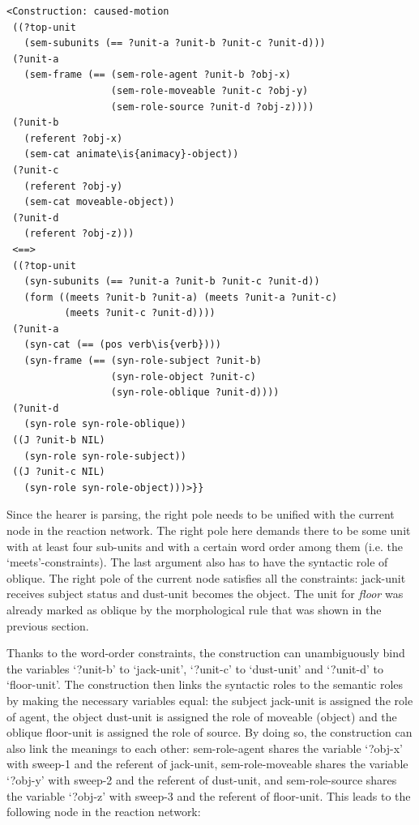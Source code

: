 \ea
\begin{lstlisting}
<Construction: caused-motion
 ((?top-unit
   (sem-subunits (== ?unit-a ?unit-b ?unit-c ?unit-d)))
 (?unit-a
   (sem-frame (== (sem-role-agent ?unit-b ?obj-x)
                  (sem-role-moveable ?unit-c ?obj-y)
                  (sem-role-source ?unit-d ?obj-z))))
 (?unit-b
   (referent ?obj-x)
   (sem-cat animate\is{animacy}-object))
 (?unit-c
   (referent ?obj-y)
   (sem-cat moveable-object))
 (?unit-d
   (referent ?obj-z)))
 <==>
 ((?top-unit
   (syn-subunits (== ?unit-a ?unit-b ?unit-c ?unit-d))
   (form ((meets ?unit-b ?unit-a) (meets ?unit-a ?unit-c)
          (meets ?unit-c ?unit-d))))
 (?unit-a
   (syn-cat (== (pos verb\is{verb})))
   (syn-frame (== (syn-role-subject ?unit-b)
                  (syn-role-object ?unit-c)
                  (syn-role-oblique ?unit-d))))
 (?unit-d
   (syn-role syn-role-oblique))
 ((J ?unit-b NIL)
   (syn-role syn-role-subject))
 ((J ?unit-c NIL) 
   (syn-role syn-role-object)))>}}

\end{lstlisting}
\z

Since the hearer is parsing, the right pole needs to be unified with the current node in the reaction network. The right pole here demands there to be some unit with at least four sub-units and with a certain word order among them (i.e. the `meets'-constraints). The last argument also has to have the syntactic role of oblique. The right pole of the current node satisfies all the constraints: jack-unit receives subject status and dust-unit becomes the object. The unit for {\em floor} was already marked as oblique by the morphological rule that was shown in the previous section.

Thanks to the word-order constraints, the construction can unambiguously bind the variables `?unit-b' to `jack-unit', `?unit-c' to `dust-unit' and `?unit-d' to `floor-unit'. The construction then links the syntactic roles to the semantic roles by making the necessary variables equal: the subject jack-unit is assigned the role of agent, the object dust-unit is assigned the role of moveable (object) and the oblique floor-unit is assigned the role of source. By doing so, the construction can also link the meanings to each other: sem-role-agent shares the variable `?obj-x' with sweep-1 and the referent of jack-unit, sem-role-moveable shares the variable `?obj-y' with sweep-2 and the referent of dust-unit, and sem-role-source shares the variable `?obj-z' with sweep-3 and the referent of floor-unit. This leads to the following node in the reaction network:


